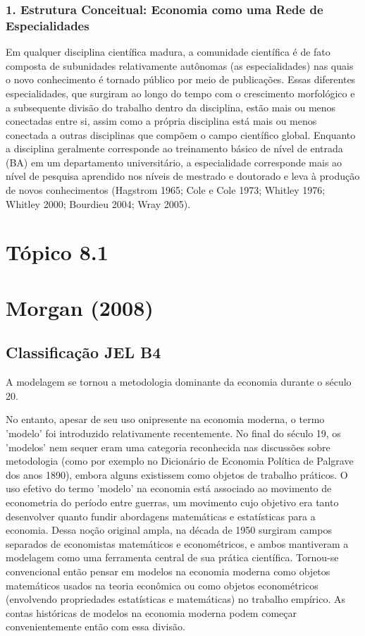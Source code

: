 \documentclass[12pt]{article}
\begin{document}
\subsubsection{\textbf{1. Estrutura Conceitual: Economia como uma Rede de Especialidades}}

Em qualquer disciplina científica madura, a comunidade científica é de fato composta de subunidades relativamente autônomas (as especialidades) nas quais o novo conhecimento é tornado público por meio de publicações. Essas diferentes especialidades, que surgiram ao longo do tempo com o crescimento morfológico e a subsequente divisão do trabalho dentro da disciplina, estão mais ou menos conectadas entre si, assim como a própria disciplina está mais ou menos conectada a outras disciplinas que compõem o campo científico global. Enquanto a disciplina geralmente corresponde ao treinamento básico de nível de entrada (BA) em um departamento universitário, a especialidade corresponde mais ao nível de pesquisa aprendido nos níveis de mestrado e doutorado e leva à produção de novos conhecimentos (Hagstrom 1965; Cole e Cole 1973; Whitley 1976; Whitley 2000; Bourdieu 2004; Wray 2005).

\newpage
\section*{\textbf{Tópico 8.1}}
\section{\textbf{Morgan (2008)}}
\subsection{\textbf{Classificação JEL B4}}
A modelagem se tornou a metodologia dominante da economia durante o século 20.

No entanto, apesar de seu uso onipresente na economia moderna, o termo 'modelo' foi introduzido relativamente recentemente. No final do século 19, os 'modelos' nem sequer eram uma categoria reconhecida nas discussões sobre metodologia (como por exemplo no Dicionário de Economia Política de Palgrave dos anos 1890), embora alguns existissem como objetos de trabalho práticos. O uso efetivo do termo 'modelo' na economia está associado ao movimento de econometria do período entre guerras, um movimento cujo objetivo era tanto desenvolver quanto fundir abordagens matemáticas e estatísticas para a economia. Dessa noção original ampla, na década de 1950 surgiram campos separados de economistas matemáticos e econométricos, e ambos mantiveram a modelagem como uma ferramenta central de sua prática científica. Tornou-se convencional então pensar em modelos na economia moderna como objetos matemáticos usados na teoria econômica ou como objetos econométricos (envolvendo propriedades estatísticas e matemáticas) no trabalho empírico. As contas históricas de modelos na economia moderna podem começar convenientemente então com essa divisão.
\end{document}
